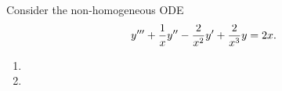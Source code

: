 Consider the non-homogeneous ODE
$$y''' + \over{x} y'' - \frac{2}{x^2}y' + \frac{2}{x^3}y = 2x.$$
\begin{enumerate}[label=(\alph*)]
    \item \newpage
    \item 
\end{enumerate}